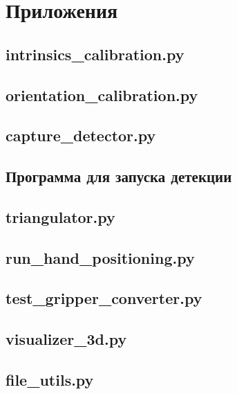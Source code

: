 \documentclass[12pt, a4paper]{article}
\begin{document}
\section{Приложения}
\subsection{intrinsics\_calibration.py}



\subsection{orientation\_calibration.py}
 

\subsection{capture\_detector.py}

\subsection{Программа для запуска детекции}


\subsection{triangulator.py}


\subsection{run\_hand\_positioning.py}


\subsection{test\_gripper\_converter.py}


\subsection{visualizer\_3d.py}


\subsection{file\_utils.py}


\printbibliography
% 
% 
  
\end{document}
